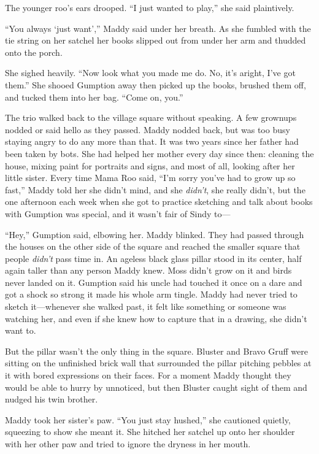 \documentclass[10pt]{article}
\begin{document}
The younger roo's ears drooped. ``I just wanted to play,'' she said
plaintively.

``You always `just want','' Maddy said under her breath. As she fumbled
with the tie string on her satchel her books slipped out from under her
arm and thudded onto the porch.

She sighed heavily. ``Now look what you made me do. No, it's aright,
I've got them.'' She shooed Gumption away then picked up the books,
brushed them off, and tucked them into her bag. ``Come on, you.''

The trio walked back to the village square without speaking. A few
grownups nodded or said hello as they passed. Maddy nodded back, but was
too busy staying angry to do any more than that. It was two years since
her father had been taken by bots. She had helped her mother every day
since then: cleaning the house, mixing paint for portraits and signs,
and most of all, looking after her little sister. Every time Mama Roo
said, ``I'm sorry you've had to grow up so fast,'' Maddy told her she
didn't mind, and she \emph{didn't}, she really didn't, but the one
afternoon each week when she got to practice sketching and talk about
books with Gumption was special, and it wasn't fair of Sindy to---

``Hey,'' Gumption said, elbowing her. Maddy blinked. They had passed
through the houses on the other side of the square and reached the
smaller square that people \emph{didn't} pass time in. An ageless black
glass pillar stood in its center, half again taller than any person
Maddy knew. Moss didn't grow on it and birds never landed on it.
Gumption said his uncle had touched it once on a dare and got a shock so
strong it made his whole arm tingle. Maddy had never tried to sketch
it---whenever she walked past, it felt like something or someone was
watching her, and even if she knew how to capture that in a drawing, she
didn't want to.

But the pillar wasn't the only thing in the square. Bluster and Bravo
Gruff were sitting on the unfinished brick wall that surrounded the
pillar pitching pebbles at it with bored expressions on their faces. For
a moment Maddy thought they would be able to hurry by unnoticed, but
then Bluster caught sight of them and nudged his twin brother.

Maddy took her sister's paw. ``You just stay hushed,'' she cautioned
quietly, squeezing to show she meant it. She hitched her satchel up onto
her shoulder with her other paw and tried to ignore the dryness in her
mouth.
\end{document}
